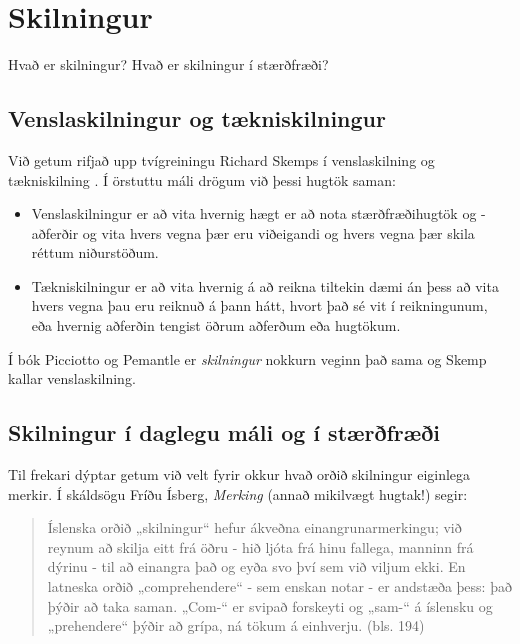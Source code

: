 \documentclass[
  icelandic,
]{book}
\providecommand{\tightlist}{%
  \setlength{\itemsep}{0pt}\setlength{\parskip}{0pt}}
\begin{document}
\chapter{Skilningur}\label{skilning}

Hvað er skilningur? Hvað er skilningur í stærðfræði?

\section{Venslaskilningur og tækniskilningur}\label{vensla-taekni}

Við getum rifjað upp tvígreiningu Richard Skemps í venslaskilning og tækniskilning \autocite{skemp1976}. Í örstuttu máli drögum við þessi hugtök saman:

\begin{itemize}
\tightlist
\item
  Venslaskilningur er að vita hvernig hægt er að nota stærðfræðihugtök og -aðferðir og vita hvers vegna þær eru viðeigandi og hvers vegna þær skila réttum niðurstöðum.
\item
  Tækniskilningur er að vita hvernig á að reikna tiltekin dæmi án þess að vita hvers vegna þau eru reiknuð á þann hátt, hvort það sé vit í reikningunum, eða hvernig aðferðin tengist öðrum aðferðum eða hugtökum.
\end{itemize}

Í bók Picciotto og Pemantle er \emph{skilningur} nokkurn veginn það sama og Skemp kallar venslaskilning.

\section{Skilningur í daglegu máli og í stærðfræði}\label{skiln-dag-stae}

Til frekari dýptar getum við velt fyrir okkur hvað orðið skilningur eiginlega merkir. Í skáldsögu Fríðu Ísberg, \emph{Merking} \autocite{isberg2021} (annað mikilvægt hugtak!) segir:

\begin{quote}
Íslenska orðið „skilningur`` hefur ákveðna einangrunarmerkingu; við reynum að skilja eitt frá öðru - hið ljóta frá hinu fallega, manninn frá dýrinu - til að einangra það og eyða svo því sem við viljum ekki. En latneska orðið „comprehendere`` - sem enskan notar - er andstæða þess: það þýðir að taka saman. „Com-`` er svipað forskeyti og „sam-`` á íslensku og „prehendere`` þýðir að grípa, ná tökum á einhverju. (bls. 194)
\end{quote}
\end{document}
